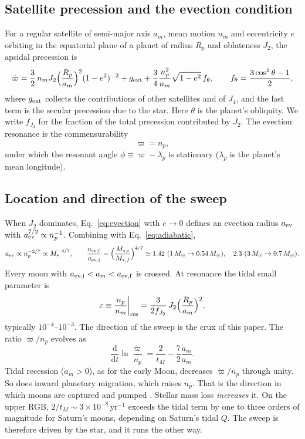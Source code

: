 \documentclass[11pt,a4paper]{article}
\newcommand{\msun}{M_\odot}
\newcommand{\eps}{\varepsilon}
\newcommand{\fJ}{f_{J_2}}
\newcommand{\dd}{\mathrm{d}}
\begin{document}
\subsection{Satellite precession and the evection condition}

For a regular satellite of semi-major axis $a_m$, mean motion $n_m$ and eccentricity $e$ orbiting in the equatorial plane of a planet of radius $R_p$ and oblateness $J_2$, the apsidal precession is
\begin{equation}
\dot\varpi=\frac{3}{2}\,n_m J_2\Big(\frac{R_p}{a_m}\Big)^{2}(1-e^2)^{-2}+g_{\rm ext}+\frac{3}{4}\frac{n_p^2}{n_m}\sqrt{1-e^2}\,f_\theta,
\qquad f_\theta=\frac{3\cos^2\theta-1}{2},
\label{eq:precession}
\end{equation}
where $g_{\rm ext}$ collects the contributions of other satellites and of $J_4$, and the last term is the secular precession due to the star. Here $\theta$ is the planet's obliquity. We write $\fJ$ for the fraction of the total precession contributed by $J_2$. The evection resonance is the commensurability
\begin{equation}
\dot\varpi=n_p ,
\label{eq:evection}
\end{equation}
under which the resonant angle $\phi\equiv\varpi-\lambda_p$ is stationary ($\lambda_p$ is the planet's mean longitude).

\subsection{Location and direction of the sweep}

When $J_2$ dominates, Eq.~\eqref{eq:evection} with $e\to0$ defines an evection radius $a_{\rm ev}$ with $a_{\rm ev}^{7/2}\propto n_p^{-1}$. Combining with Eq.~\eqref{eq:adiabatic},
\begin{equation}
a_{\rm ev}\propto n_p^{-2/7}\propto M_\ast^{-4/7},\qquad \frac{a_{\rm ev,f}}{a_{\rm ev,i}}=\Big(\frac{M_{\ast,i}}{M_{\ast,f}}\Big)^{4/7}\simeq1.42\ (1\,\msun\to0.54\,\msun),\quad 2.3\ (3\,\msun\to0.7\,\msun).
\label{eq:sweep}
\end{equation}
Every moon with $a_{\rm ev,i}<a_m<a_{\rm ev,f}$ is crossed. At resonance the tidal small parameter is
\begin{equation}
\eps\equiv\frac{n_p}{n_m}\bigg|_{\rm res}=\frac{3}{2\fJ}\,J_2\Big(\frac{R_p}{a_m}\Big)^{2},
\label{eq:epsres}
\end{equation}
typically $10^{-4}$--$10^{-3}$. The direction of the sweep is the crux of this paper. The ratio $\dot\varpi/n_p$ evolves as
\begin{equation}
\frac{\dd}{\dd t}\ln\frac{\dot\varpi}{n_p}=\frac{2}{t_M}-\frac{7}{2}\frac{\dot a_m}{a_m}.
\label{eq:direction}
\end{equation}
Tidal recession ($\dot a_m>0$), as for the early Moon, decreases $\dot\varpi/n_p$ through unity. So does inward planetary migration, which raises $n_p$. That is the direction in which moons are captured and pumped \citep{Touma1998,Spalding2016}. Stellar mass loss \emph{increases} it. On the upper RGB, $2/t_M\sim3\times10^{-8}$\,yr$^{-1}$ exceeds the tidal term by one to three orders of magnitude for Saturn's moons, depending on Saturn's tidal $Q$. The sweep is therefore driven by the star, and it runs the other way.
\end{document}

